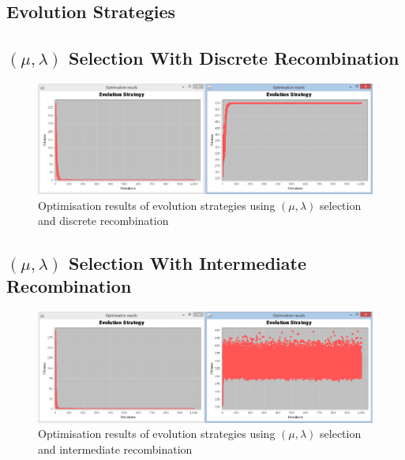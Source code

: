 \begin{landscape}
\section{Evolution Strategies}
\subsection{$(\mu,\lambda)$ Selection With Discrete Recombination}
\label{sec:appendix11}
  \begin{figure}[h]
    \begin{center}
      \includegraphics{Figures/es_comma_d}
    \end{center}
    \caption{Optimisation results of evolution strategies using $(\mu,\lambda)$ selection and discrete recombination}
    \label{fig:phase1}
  \end{figure}
\end{landscape}

\begin{landscape}
\subsection{$(\mu,\lambda)$ Selection With Intermediate Recombination}
\label{sec:appendix12}
  \begin{figure}[h]
    \begin{center}
      \includegraphics{Figures/es_comma_i}
    \end{center}
    \caption{Optimisation results of evolution strategies using $(\mu,\lambda)$ selection and intermediate recombination}
    \label{fig:phase1}
  \end{figure}
\end{landscape}

